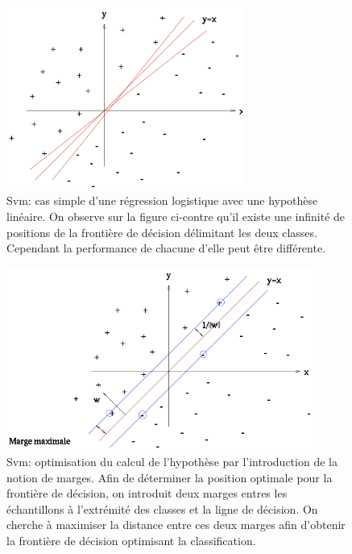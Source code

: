 \begin{figure}[h]
	\centering\includegraphics[height=6cm]{images/svm_no_margin.png}
	\caption[SVM: cas simple d'une régression logistique avec une hypothèse linéaire]{Svm: cas simple d'une régression logistique avec une hypothèse linéaire. On observe sur la figure ci-contre qu'il existe une infinité de positions de la frontière de décision délimitant les deux classes. Cependant la performance de chacune d'elle peut être différente.}
	\label{fig:Svm: cas simple d'une regression logistique avec une hypothèse linéaire}
\end{figure}

\begin{figure}[h]
	\centering\includegraphics[height=6cm]{images/svm_margin.png}
	\caption[SVM: optimisation du calcul de l'hypothèse par l'introduction de marges]{Svm: optimisation du calcul de l'hypothèse par l'introduction de la notion de marges. Afin de déterminer la position optimale pour la frontière de décision, on introduit deux marges entres les échantillons à l'extrémité des classes et la ligne de décision. On cherche à maximiser la distance entre ces deux marges afin d'obtenir la frontière de décision optimisant la classification.}
	\label{fig:Svm: optimisation du calcul de l'hypothèse par l'introduction de marges}
\end{figure}

